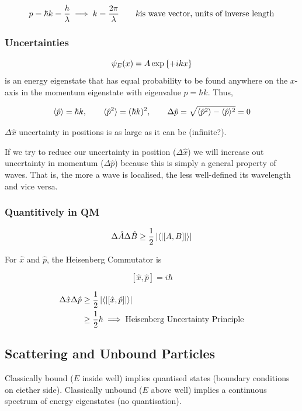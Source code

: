 \documentclass[english, 11pt]{article}
\begin{document}
      \[ p = \hbar k = \frac{h}{\lambda} \implies k = \frac{2\pi}{\lambda} \ \ \ \ \ \ k \mbox{is wave vector, units of inverse length} \]

      \subsubsection{Uncertainties}

      \[ \psi_E(x) = A\exp \left\{ +ikx \right\} \]
      is an energy eigenstate that has equal probability to be found anywhere on the $x$-axis in the momentum eigenstate with eigenvalue $p = \hbar k$. Thus,

      \[ \E{\hat{p}} = \hbar k, \ \ \ \ \ \ \E{\hat{p}^2} = (\hbar k)^2,  \ \ \ \ \ \ \Delta \hat{p} = \sqrt{\E{\hat{p}^2} - \E{\hat{p}}^2} = 0 \]

      $\Delta \hat{x}$ uncertainty in positions is as large as it can be (infinite?). \newline

      If we try to reduce our uncertainty in position ($\Delta \hat{x}$) we will increase out uncertainty in momentum ($\Delta \hat{p}$) because this is simply a general property of waves. That is, the more a wave is localised, the less well-defined its wavelength and vice versa.

      \subsubsection{Quantitively in QM}

      \[ \Delta \hat{A} \Delta \hat{B} \geq \frac{1}{2} \left|\langle\left|\left[A,B\right]\right|\rangle\right| \]

      For $\hat{x}$ and $\hat{p}$, the Heisenberg Commutator is

      \[ [\hat{x},\hat{p}] = i\hbar \]

      \begin{align*}
        \Delta \hat{x} \Delta \hat{p} & \geq \frac{1}{2} \left|\langle\left|\left[\hat{x},\hat{p}\right]\right|\rangle\right| \\
        & \geq \frac{1}{2} \hbar \implies \mbox{Heisenberg Uncertainty Principle}
      \end{align*}

    \subsection{Scattering and Unbound Particles}

      Classically bound ($E$ inside well) implies quantised states (boundary conditions on eiether side).\newline
      Classically unbound ($E$ above well) implies a continuous spectrum of energy eigenstates (no quantisation). \newline
\end{document}
